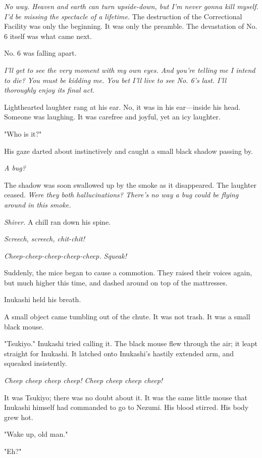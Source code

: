 \emph{No way. Heaven and earth can turn upside-down, but I'm never gonna kill
myself. I'd be missing the spectacle of a lifetime.} The destruction of
the Correctional Facility was only the beginning. It was only the
preamble. The devastation of No. 6 itself was what came next.

No. 6 was falling apart.

\emph{I'll get to see the very moment with my own eyes. And you're telling me
I intend to die? You must be kidding me. You bet I'll live to see No.
6's last. I'll thoroughly enjoy its final act.}


Lighthearted laughter rang at his ear. No, it was in his ear---inside his
head. Someone was laughing. It was carefree and joyful, yet an icy
laughter.

"Who is it?"

His gaze darted about instinctively and caught a small black shadow
passing by.

\emph{A bug?}

The shadow was soon swallowed up by the smoke as it disappeared. The
laughter ceased. \emph{Were they both hallucinations? There's no way a bug
could be flying around in this smoke.}

\emph{Shiver.} A chill ran down his spine.

\emph{Screech, screech, chit-chit!}

\emph{Cheep-cheep-cheep-cheep-cheep. Squeak!}

Suddenly, the mice began to cause a commotion. They raised their voices
again, but much higher this time, and dashed around on top of the
mattresses.

Inukashi held his breath.

A small object came tumbling out of the chute. It was not trash. It was
a small black mouse.

"Tsukiyo." Inukashi tried calling it. The black mouse flew through the
air; it leapt straight for Inukashi. It latched onto Inukashi's hastily
extended arm, and squeaked insistently.

\emph{Cheep cheep cheep cheep! Cheep cheep cheep cheep!}

It was Tsukiyo; there was no doubt about it. It was the same little
mouse that Inukashi himself had commanded to go to Nezumi. His blood
stirred. His body grew hot.

"Wake up, old man."

"Eh?"

